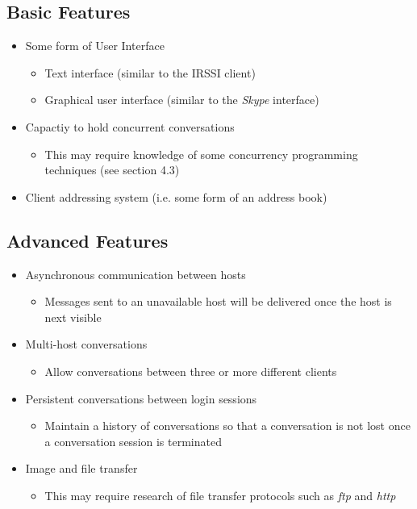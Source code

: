 \documentclass[a4paper, 12pt]{article}
\begin{document}
\subsection{Basic Features}
\begin{itemize}
\item Some form of User Interface
    \begin{itemize}
    \item Text interface (similar to the IRSSI client)
    \item Graphical user interface (similar to the \emph{Skype} interface)
    \end{itemize}
\item Capactiy to hold concurrent conversations
    \begin{itemize}
    \item This may require knowledge of some concurrency programming
    techniques (see section 4.3)
    \end{itemize}
\item Client addressing system (i.e. some form of an address book)
\end{itemize}

\subsection{Advanced Features}
\begin{itemize}
\item Asynchronous communication between hosts
    \begin{itemize}
    \item Messages sent to an unavailable host will be delivered once the host
    is next visible
    \end{itemize}
\item Multi-host conversations
    \begin{itemize}
    \item Allow conversations between three or more different clients
    \end{itemize}
\item Persistent conversations between login sessions
    \begin{itemize}
    \item Maintain a history of conversations so that a conversation is not
    lost once a conversation session is terminated
    \end{itemize}
\item Image and file transfer
    \begin{itemize}
    \item This may require research of file transfer protocols such as \emph{ftp} and
    \emph{http}
    \end{itemize}
\end{itemize}
\end{document}
